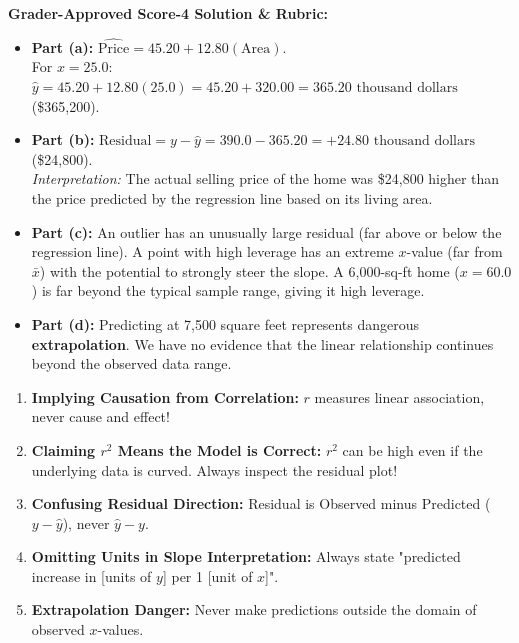 \begin{frqrubricbox}
\textbf{Grader-Approved Score-4 Solution \& Rubric:}
\begin{itemize}[leftmargin=1.2em]
  \item \textbf{Part (a):} $\widehat{\text{Price}} = 45.20 + 12.80(\text{Area})$.\\
  For $x = 25.0$: $\hat{y} = 45.20 + 12.80(25.0) = 45.20 + 320.00 = 365.20\text{ thousand dollars}$ (\$365,200).
  \item \textbf{Part (b):} $\text{Residual} = y - \hat{y} = 390.0 - 365.20 = +24.80\text{ thousand dollars}$ (\$24,800).\\
  \textit{Interpretation:} The actual selling price of the home was \$24,800 higher than the price predicted by the regression line based on its living area.
  \item \textbf{Part (c):} An outlier has an unusually large residual (far above or below the regression line). A point with high leverage has an extreme $x$-value (far from $\bar{x}$) with the potential to strongly steer the slope. A 6,000-sq-ft home ($x = 60.0$) is far beyond the typical sample range, giving it high leverage.
  \item \textbf{Part (d):} Predicting at 7,500 square feet represents dangerous \textbf{extrapolation}. We have no evidence that the linear relationship continues beyond the observed data range.
\end{itemize}
\end{frqrubricbox}

\begin{trapbox}
\begin{enumerate}[leftmargin=1.2em]
  \item \textbf{Implying Causation from Correlation:} $r$ measures linear association, never cause and effect!
  \item \textbf{Claiming $r^2$ Means the Model is Correct:} $r^2$ can be high even if the underlying data is curved. Always inspect the residual plot!
  \item \textbf{Confusing Residual Direction:} Residual is Observed minus Predicted ($y - \hat{y}$), never $\hat{y} - y$.
  \item \textbf{Omitting Units in Slope Interpretation:} Always state "predicted increase in [units of $y$] per 1 [unit of $x$]".
  \item \textbf{Extrapolation Danger:} Never make predictions outside the domain of observed $x$-values.
\end{enumerate}
\end{trapbox}
